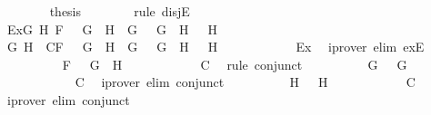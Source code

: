 \begin{isabellebody}
\ \ \ \ \ \ \isamarkupfalse%
\ {\isacharquery}thesis\isanewline
\ \ \ \ \ \ \isamarkupfalse%
\ {\isacharparenleft}rule\ disjE{\isacharparenright}\isanewline
\ \ \ \ \ \ \ \ \isamarkupfalse%
\ Ex{}{\isacharcolon}{\isachardoublequoteopen}{\isasymexists}G{}\ H{}{\isachardot}\ F\ {\isacharequal}\ \isactrlbold {\isasymnot}\ {\isacharparenleft}G{}\ \isactrlbold {\isasymand}\ H{}{\isacharparenright}\ {\isasymand}\ G\ {\isacharequal}\ \isactrlbold {\isasymnot}\ G{}\ {\isasymand}\ H\ {\isacharequal}\ \isactrlbold {\isasymnot}\ H{}{\isachardoublequoteclose}\isanewline
\ \ \ \ \ \ \ \ \isamarkupfalse%
\ G{}\ H{}\ \ C{}{\isacharcolon}{\isachardoublequoteopen}F\ {\isacharequal}\ \isactrlbold {\isasymnot}\ {\isacharparenleft}G{}\ \isactrlbold {\isasymand}\ H{}{\isacharparenright}\ {\isasymand}\ G\ {\isacharequal}\ \isactrlbold {\isasymnot}\ G{}\ {\isasymand}\ H\ {\isacharequal}\ \isactrlbold {\isasymnot}\ H{}{\isachardoublequoteclose}\isanewline
\ \ \ \ \ \ \ \ \ \ \isamarkupfalse%
\ Ex{}\ \isamarkupfalse%
\ {\isacharparenleft}iprover\ elim{\isacharcolon}\ exE{\isacharparenright}\isanewline
\ \ \ \ \ \ \ \ \isamarkupfalse%
\ {\isachardoublequoteopen}F\ {\isacharequal}\ \isactrlbold {\isasymnot}\ {\isacharparenleft}G{}\ \isactrlbold {\isasymand}\ H{}{\isacharparenright}{\isachardoublequoteclose}\isanewline
\ \ \ \ \ \ \ \ \ \ \isamarkupfalse%
\ C{}\ \isamarkupfalse%
\ {\isacharparenleft}rule\ conjunct{}{\isacharparenright}\isanewline
\ \ \ \ \ \ \ \ \isamarkupfalse%
\ {\isachardoublequoteopen}G\ {\isacharequal}\ \isactrlbold {\isasymnot}\ G{}{\isachardoublequoteclose}\isanewline
\ \ \ \ \ \ \ \ \ \ \isamarkupfalse%
\ C{}\ \isamarkupfalse%
\ {\isacharparenleft}iprover\ elim{\isacharcolon}\ conjunct{}{\isacharparenright}\isanewline
\ \ \ \ \ \ \ \ \isamarkupfalse%
\ {\isachardoublequoteopen}H\ {\isacharequal}\ \isactrlbold {\isasymnot}\ H{}{\isachardoublequoteclose}\isanewline
\ \ \ \ \ \ \ \ \ \ \isamarkupfalse%
\ C{}\ \isamarkupfalse%
\ {\isacharparenleft}iprover\ elim{\isacharcolon}\ conjunct{}{\isacharparenright}\isanewline

\end{isabellebody}
